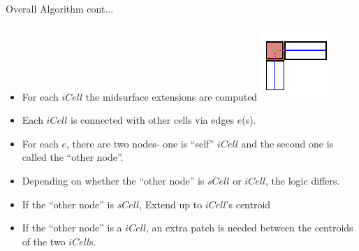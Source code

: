 \begin{frame}{Overall Algorithm cont...}
\begin{itemize}[noitemsep,label=\textbullet,topsep=2pt,parsep=2pt,partopsep=2pt]
\item  For each $iCell$ the midsurface extensions are computed
\vspace{-2mm}
	\includegraphics[width=0.25\linewidth]{../Common/images/MidsurfJoining.pdf}	
\vspace{-2mm}	
\item Each $iCell$ is connected with other cells via edges $e$(s). 
\item For each $e$, there are two nodes- one is ``self'' $iCell$ and the second   one is called the ``other node''. 
\item Depending on whether the ``other node'' is $sCell$ or $iCell$, the logic differs. 
\item If the ``other node'' is $sCell$, Extend  up to $iCell$'s centroid
\item  If the ``other node'' is a $iCell$, an extra patch is needed between the centroids of the two $iCell$s.
\end{itemize}
\end{frame}
